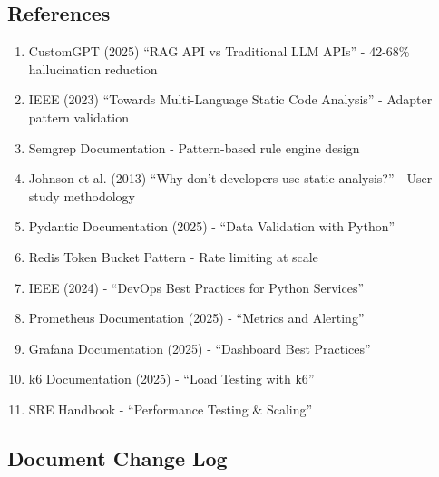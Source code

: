 \documentclass[11pt,a4paper]{article}
\begin{document}
\subsection{References}
\begin{enumerate}
    \item CustomGPT (2025) ``RAG API vs Traditional LLM APIs'' - 42-68\% hallucination reduction
    \item IEEE (2023) ``Towards Multi-Language Static Code Analysis'' - Adapter pattern validation
    \item Semgrep Documentation - Pattern-based rule engine design
    \item Johnson et al. (2013) ``Why don't developers use static analysis?'' - User study methodology
    \item Pydantic Documentation (2025) - ``Data Validation with Python''
    \item Redis Token Bucket Pattern - Rate limiting at scale
    \item IEEE (2024) - ``DevOps Best Practices for Python Services''
    \item Prometheus Documentation (2025) - ``Metrics and Alerting''
    \item Grafana Documentation (2025) - ``Dashboard Best Practices''
    \item k6 Documentation (2025) - ``Load Testing with k6''
    \item SRE Handbook - ``Performance Testing \& Scaling''
\end{enumerate}

\subsection{Document Change Log}
\end{document}
